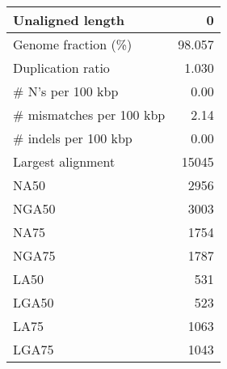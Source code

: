 \documentclass[12pt,a4paper]{article}
\begin{document}
\begin{table}[ht]
\begin{center}
\begin{tabular}{|l*{1}{|r}|}
Unaligned length & 0 \\ \hline
Genome fraction (\%) & 98.057 \\ \hline
Duplication ratio & 1.030 \\ \hline
\# N's per 100 kbp & 0.00 \\ \hline
\# mismatches per 100 kbp & 2.14 \\ \hline
\# indels per 100 kbp & 0.00 \\ \hline
Largest alignment & 15045 \\ \hline
NA50 & 2956 \\ \hline
NGA50 & 3003 \\ \hline
NA75 & 1754 \\ \hline
NGA75 & 1787 \\ \hline
LA50 & 531 \\ \hline
LGA50 & 523 \\ \hline
LA75 & 1063 \\ \hline
LGA75 & 1043 \\ \hline
\end{tabular}
\end{center}
\end{table}
\end{document}
